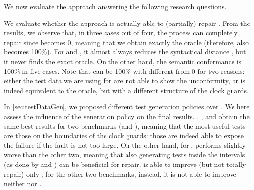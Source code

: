\begin{tikzborder}{\cite{Gargantini16:validation}}
\begin{tikzborder}{\cite{gargantini_combinatorial_2017}}
\begin{tikzborder}{\cite{gargantini_combinatorial_2017}}
\begin{tikzborder}{\cite{garn2019}}
\begin{tikzborder}{\cite{arcaini2019achieving}}
\begin{tikzborder}{\cite{arcaini2019varivolution}}
\begin{tikzborder}{}
We now evaluate the approach answering the following research questions.

We evaluate whether the approach is actually able to (partially) repair \initTa. From the results, we observe that, in three cases out of four, the process can completely repair \benchmarkExampleShort since \syntDist becomes 0, meaning that we obtain exactly the oracle (therefore, also \semConf becomes 100\%). For \benchmarkCoffeeShort and \benchmarkCarAlarmShort, it almost always reduces the syntactical distance \syntDist, but it never finds the exact oracle. On the other hand, the semantic conformance \semConf is 100\% in five cases. Note that \semConf can be 100\% with \syntDist different from 0 for two reasons: either the test data \testDataConf we are using for \semConf are not able to show the unconformity, or \repTa is indeed equivalent to the oracle, but with a different structure of the clock guards.


In \ref{sec:testDataGen}, we proposed different test generation policies over \epzg. We here assess the influence of the generation policy on the final results. \policyminusplus, \policymiddle, and \policyquarter obtain the same best results for two benchmarks (\benchmarkExampleShort and \benchmarkCarAlarmShort), meaning that the most useful tests are those on the boundaries of the clock guards: those are indeed able to expose the failure if the fault is not too large. On the other hand, for \benchmarkCoffeeShort, \policyminusplus performs slightly worse than the other two, meaning that also generating tests inside the intervals (as done by \policymiddle and \policyquarter) can be beneficial for repair. \policyrand is able to improve (but not totally repair) only \benchmarkCoffeeShort; for the other two benchmarks, instead, it is not able to improve neither \syntDist nor \semConf.


\end{tikzborder}
\end{tikzborder}
\end{tikzborder}
\end{tikzborder}
\end{tikzborder}
\end{tikzborder}
\end{tikzborder}

